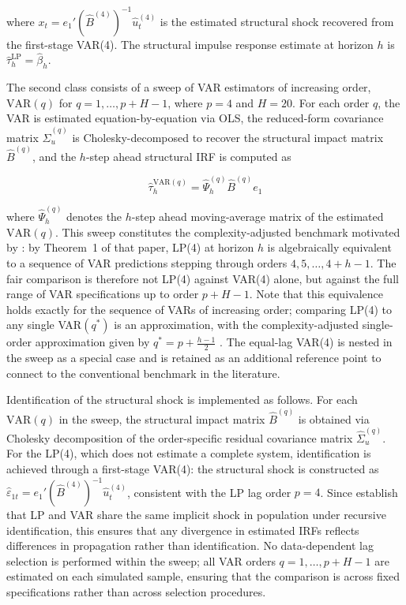 where $x_t = e_1'(\hat{B}^{(4)})^{-1}\hat{u}_t^{(4)}$ is the estimated 
structural shock recovered from the first-stage VAR(4). The structural 
impulse response estimate at horizon $h$ is $\hat{\tau}_h^{\mathrm{LP}} 
= \hat{\beta}_h$.

The second class consists of a sweep of VAR estimators of increasing order, 
$\mathrm{VAR}(q)$ for $q = 1, \ldots, p + H - 1$, where $p = 4$ and $H = 20$. 
For each order $q$, the VAR is estimated equation-by-equation via OLS, the 
reduced-form covariance matrix $\hat{\Sigma}_u^{(q)}$ is Cholesky-decomposed 
to recover the structural impact matrix $\hat{B}^{(q)}$, and the $h$-step 
ahead structural IRF is computed as

\begin{equation}
    \hat{\tau}_h^{\mathrm{VAR}(q)} = \hat{\Psi}_h^{(q)} \hat{B}^{(q)} e_1
\end{equation}

where $\hat{\Psi}_h^{(q)}$ denotes the $h$-step ahead moving-average matrix 
of the estimated $\mathrm{VAR}(q)$. This sweep constitutes the 
complexity-adjusted benchmark motivated by \textcite{ludwig2026local}: by 
Theorem~1 of that paper, LP(4) at horizon $h$ is algebraically equivalent to 
a sequence of VAR predictions stepping through orders $4, 5, \ldots, 4 + h - 1$. 
The fair comparison is therefore not LP(4) against VAR(4) alone, but against 
the full range of VAR specifications up to order $p + H - 1$. Note that this 
equivalence holds exactly for the sequence of VARs of increasing order; 
comparing LP(4) to any single VAR$(q^*)$ is an approximation, with the 
complexity-adjusted single-order approximation given by $q^* = p + 
\frac{h-1}{2}$ \parencite{ludwig2026local}. The equal-lag VAR(4) is nested 
in the sweep as a special case and is retained as an additional reference 
point to connect to the conventional benchmark in the literature.

Identification of the structural shock is implemented as follows. For each 
$\mathrm{VAR}(q)$ in the sweep, the structural impact matrix $\hat{B}^{(q)}$ 
is obtained via Cholesky decomposition of the order-specific residual 
covariance matrix $\hat{\Sigma}_u^{(q)}$. For the LP(4), which does not 
estimate a complete system, identification is achieved through a first-stage 
VAR(4): the structural shock is constructed as $\hat{\varepsilon}_{1t} = 
e_1'(\hat{B}^{(4)})^{-1}\hat{u}_t^{(4)}$, consistent with the LP lag order 
$p = 4$. Since \textcite{plagborg2021local} establish that LP and VAR share 
the same implicit shock in population under recursive identification, this 
ensures that any divergence in estimated IRFs reflects differences in 
propagation rather than identification. No data-dependent lag selection is 
performed within the sweep; all VAR orders $q = 1, \ldots, p + H - 1$ are 
estimated on each simulated sample, ensuring that the comparison is across 
fixed specifications rather than across selection procedures.

